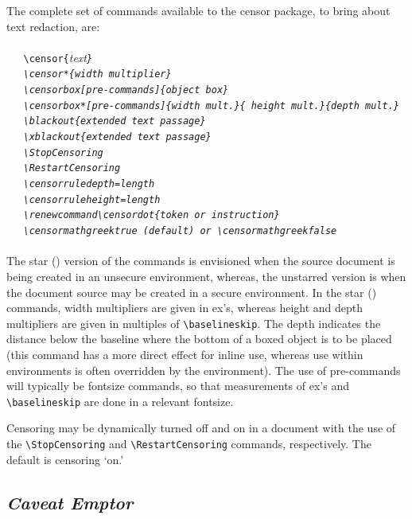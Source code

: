\documentclass{article}
\begin{document}
The complete set of commands available to the \textsf{censor} package,
to bring about text redaction, are:\\
{~\\
\verb|   \censor{|\it text\tt\}\\
\verb|   \censor*{|\it width multiplier\tt\}\\
\verb|   \censorbox[|\it pre-commands\tt]\{\it object box\tt\}\\
\verb|   \censorbox*[|\it pre-commands\tt]\{\it width mult.\tt\}\{\it 
height mult.\tt\}\{\it depth mult.\tt\}\\
\verb|   \blackout{|\it extended text passage\tt\}\\
\verb|   \xblackout{|\it extended text passage\tt\}\\
\verb|   \StopCensoring|\\
\verb|   \RestartCensoring|\\
\verb|   \censorruledepth=|\it length\\
\verb|   \censorruleheight=|length\\
\verb|   \renewcommand\censordot{|\it token or instruction\tt\}\\
\verb|   \censormathgreektrue| \rm(default) or \verb|\censormathgreekfalse|\\
~\\}
The star ({\tt*}) version of the commands is envisioned when the source
document is being created in an unsecure environment, whereas, the
unstarred version is when the document source may be created in a secure
environment.
In the star ({\tt*}) commands, width multipliers are given in ex's,
whereas height and depth multipliers are given in multiples of
\verb|\baselineskip|.  The depth indicates the distance below the
baseline where the bottom of a boxed object is to be placed (this
command has a more direct effect for inline use, whereas use within
environments is often overridden by the environment).  The use of
pre-commands will typically be fontsize commands, so that measurements
of ex's and \verb|\baselineskip| are done in a relevant fontsize.

Censoring may be dynamically turned off and on in a document with the
use of the \verb|\StopCensoring| and \verb|\RestartCensoring| commands,
respectively.  The default is censoring `on.'  

\subsection{\textit{Caveat Emptor}}
\end{document}
